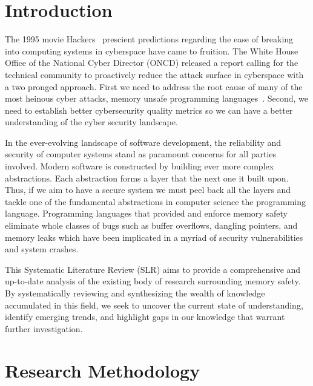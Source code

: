 \documentclass[sigconf]{acmart}
\begin{document}


\maketitle

\section{Introduction}

The 1995 movie Hackers~\cite{Wikipedia_contributors2024-zr} prescient predictions regarding the ease
of breaking into computing systems in cyberspace have came to fruition. The White House Office of
the National Cyber Director (ONCD) released a report calling for the technical community to
proactively reduce the attack surface in cyberspace with a two pronged approach. First we need to
address the root cause of many of the most heinous cyber attacks, memory unsafe programming
languages~\cite{United_States_Gov2024-pp}. Second, we need to establish better cybersecurity quality
metrics so we can have a better understanding of the cyber security landscape.

In the ever-evolving landscape of software development, the reliability and security of computer
systems stand as paramount concerns for all parties involved. Modern software is constructed by
building ever more complex abstractions. Each abstraction forms a layer that the next one it built
upon. Thus, if we aim to have a secure system we must peel back all the layers and tackle one of the
fundamental abstractions in computer science the programming language. Programming languages that
provided and enforce memory safety eliminate whole classes of bugs such as buffer overflows,
dangling pointers, and memory leaks which have been implicated in a myriad of security
vulnerabilities and system crashes.

This Systematic Literature Review (SLR) aims to provide a comprehensive and up-to-date analysis of
the existing body of research surrounding memory safety. By systematically reviewing and
synthesizing the wealth of knowledge accumulated in this field, we seek to uncover the current state
of understanding, identify emerging trends, and highlight gaps in our knowledge that warrant further
investigation.


\section{Research Methodology}
\end{document}
